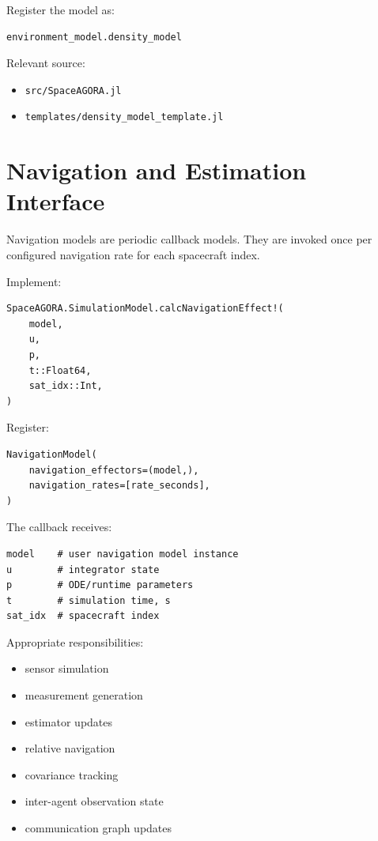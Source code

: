 \documentclass[11pt]{article}
\begin{document}
Register the model as:

\begin{lstlisting}
environment_model.density_model
\end{lstlisting}

Relevant source:
\begin{itemize}
  \item \texttt{src/SpaceAGORA.jl}
  \item \texttt{templates/density\_model\_template.jl}
\end{itemize}

\section{Navigation and Estimation Interface}

Navigation models are periodic callback models. They are invoked once per
configured navigation rate for each spacecraft index.

Implement:

\begin{lstlisting}
SpaceAGORA.SimulationModel.calcNavigationEffect!(
    model,
    u,
    p,
    t::Float64,
    sat_idx::Int,
)
\end{lstlisting}

Register:

\begin{lstlisting}
NavigationModel(
    navigation_effectors=(model,),
    navigation_rates=[rate_seconds],
)
\end{lstlisting}

The callback receives:

\begin{lstlisting}
model    # user navigation model instance
u        # integrator state
p        # ODE/runtime parameters
t        # simulation time, s
sat_idx  # spacecraft index
\end{lstlisting}

Appropriate responsibilities:
\begin{itemize}
  \item sensor simulation
  \item measurement generation
  \item estimator updates
  \item relative navigation
  \item covariance tracking
  \item inter-agent observation state
  \item communication graph updates
\end{itemize}
\end{document}

